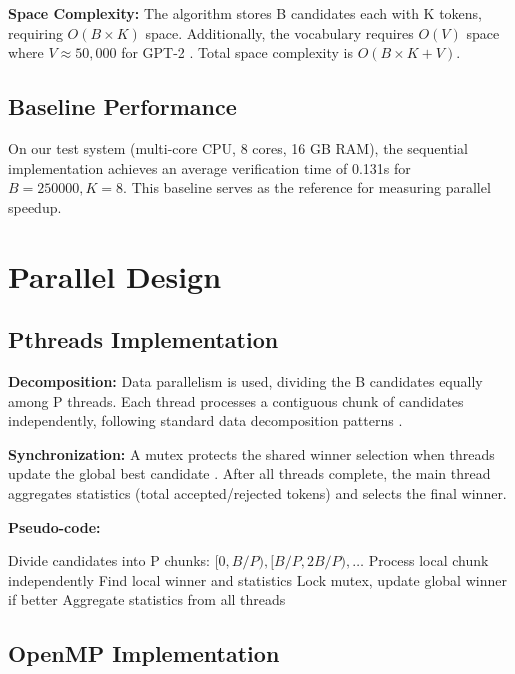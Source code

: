 \documentclass[conference]{IEEEtran}
\begin{document}
\textbf{Space Complexity:} The algorithm stores B candidates each with K tokens, requiring $O(B \times K)$ space. Additionally, the vocabulary requires $O(V)$ space where $V \approx 50,000$ for GPT-2 \cite{radford2019}. Total space complexity is $O(B \times K + V)$.

\subsection{Baseline Performance}

On our test system (multi-core CPU, 8 cores, 16 GB RAM), the sequential implementation achieves an average verification time of 0.131s for $B=250000, K=8$. This baseline serves as the reference for measuring parallel speedup.

\section{Parallel Design}
\label{sec:parallel}

\subsection{Pthreads Implementation}

\textbf{Decomposition:} Data parallelism is used, dividing the B candidates equally among P threads. Each thread processes a contiguous chunk of candidates independently, following standard data decomposition patterns \cite{grama2003,pacheco2011}.

\textbf{Synchronization:} A mutex protects the shared winner selection when threads update the global best candidate \cite{butenhof1997,herlihy2020}. After all threads complete, the main thread aggregates statistics (total accepted/rejected tokens) and selects the final winner.

\textbf{Pseudo-code:}
\begin{algorithmic}
\STATE Divide candidates into P chunks: $[0, B/P), [B/P, 2B/P), \dots$
    \STATE Process local chunk independently
    \STATE Find local winner and statistics
    \STATE Lock mutex, update global winner if better
\ENDFOR
\STATE Aggregate statistics from all threads
\end{algorithmic}

\subsection{OpenMP Implementation}
\end{document}
